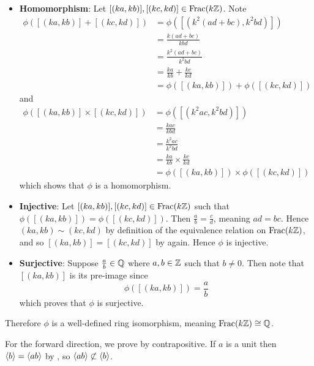 \begin{questions}
\begin{partquestions}{\alph*}
\begin{itemize}
            \item \textbf{Homomorphism}: Let $[(ka, kb)], [(kc, kd)] \in \mathrm{Frac}(k\mathbb{Z})$. Note
            \begin{align*}
                \phi([(ka,kb)] + [(kc,kd)]) &= \phi([(k^2(ad+bc), k^2bd)])\\
                &= \frac{k(ad+bc)}{kbd}\\
                &= \frac{k^2(ad+bc)}{k^2bd}\\
                &= \frac {ka}{kb} + \frac {kc}{kd}\\
                &= \phi([(ka,kb)]) + \phi([(kc,kd)])
            \end{align*}
            and
            \begin{align*}
                \phi([(ka,kb)] \times [(kc,kd)]) &= \phi([(k^2ac, k^2bd)])\\
                &= \frac{kac}{kbd}\\
                &= \frac{k^2ac}{k^2bd}\\
                &= \frac {ka}{kb} \times \frac {kc}{kd}\\
                &= \phi([(ka,kb)]) \times \phi([(kc,kd)])
            \end{align*}
            which shows that $\phi$ is a homomorphism.
            
            \item \textbf{Injective}: Let $[(ka, kb)], [(kc, kd)] \in \mathrm{Frac}(k\mathbb{Z})$ such that $\phi([(ka, kb)]) = \phi([(kc, kd)])$. Then $\frac ab = \frac cd$, meaning $ad = bc$. Hence $(ka, kb) \mathrel{\sim} (kc, kd)$ by definition of the equivalence relation on $\mathrm{Frac}(k\mathbb{Z})$, and so $[(ka, kb)] = [(kc, kd)]$ by  again. Hence $\phi$ is injective.
            
            \item \textbf{Surjective}: Suppose $\frac ab \in \mathbb{Q}$ where $a, b \in \mathbb{Z}$ such that $b \neq 0$. Then note that $[(ka, kb)]$ is its pre-image since
            \[
                \phi([(ka, kb)]) = \frac ab
            \]
            which proves that $\phi$ is surjective.
        \end{itemize}
        Therefore $\phi$ is a well-defined ring isomorphism, meaning $\mathrm{Frac}(k\mathbb{Z}) \cong \mathbb{Q}$.
    \end{partquestions}

    \item For the forward direction, we prove by contrapositive. If $a$ is a unit then $\left\langle b\right\rangle = \left\langle ab\right\rangle$ by , so $\left\langle ab\right\rangle \not\subset \left\langle b\right\rangle$.
    

\end{questions}
